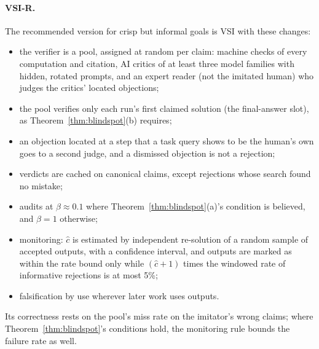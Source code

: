 \documentclass[11pt]{article}
\theoremstyle{definition}
\theoremstyle{remark}
\begin{document}
\paragraph{VSI-R.} The recommended version for crisp but informal goals \cite{threadQ2,threadU} is VSI with these changes:
\begin{itemize}[nosep]
\item the verifier is a pool, assigned at random per claim: machine checks of every computation and citation, AI critics of at least three model families with hidden, rotated prompts, and an expert reader (not the imitated human) who judges the critics' located objections;
\item the pool verifies only each run's first claimed solution (the final-answer slot), as Theorem~\ref{thm:blindspot}(b) requires;
\item an objection located at a step that a task query shows to be the human's own goes to a second judge, and a dismissed objection is not a rejection;
\item verdicts are cached on canonical claims, except rejections whose search found no mistake;
\item audits at $\beta\approx0.1$ where Theorem~\ref{thm:blindspot}(a)'s condition is believed, and $\beta=1$ otherwise;
\item monitoring: $\hat c$ is estimated by independent re-solution of a random sample of accepted outputs, with a confidence interval, and outputs are marked as within the rate bound only while $(\hat c+1)$ times the windowed rate of informative rejections is at most 5\%;
\item falsification by use wherever later work uses outputs.
\end{itemize}
Its correctness rests on the pool's miss rate on the imitator's wrong claims; where Theorem~\ref{thm:blindspot}'s conditions hold, the monitoring rule bounds the failure rate as well.
\end{document}
